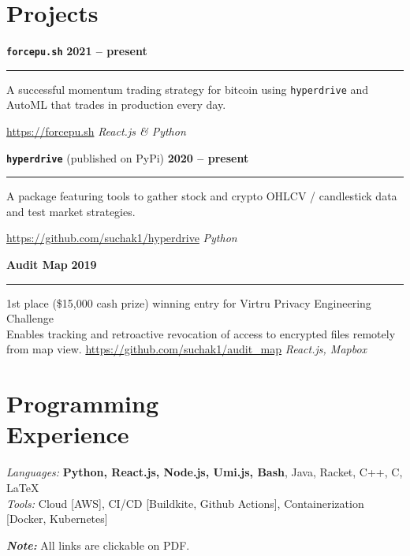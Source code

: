 \documentclass[margin]{resume}
\begin{document}
    \section{\mysidestyle Projects}

\texttt{\textbf{force}\textcolor{blu}{\textbf{pu.sh}}} \hfill \textbf{2021 -- present}
\hrule
A successful momentum trading strategy for bitcoin using \texttt{hyperdrive} and AutoML that trades in production every day.  

\url{https://forcepu.sh} \hfill \textit{React.js \& Python}


\texttt{\textbf{hyperdrive}} (published on PyPi) \hfill \textbf{2020 -- present}
\hrule
A package featuring tools to gather stock and crypto OHLCV / candlestick data and test market strategies. 

\url{https://github.com/suchak1/hyperdrive} \hfill \textit{Python}

\textcolor{blu}{\textbf{Audit Map}} \hfill \textbf{2019}
\hrule
1st place (\$15,000 cash prize) winning entry for Virtru Privacy Engineering Challenge \\ 
Enables tracking and retroactive revocation of access to encrypted files remotely from map view.
\url{https://github.com/suchak1/audit_map} \hfill \textit{React.js, Mapbox}
        \section{\mysidestyle Programming\\Experience}

    \emph{Languages:} \textbf{Python, React.js, Node.js, Umi.js, Bash}, Java, Racket, C++, C, \LaTeX \\
    \emph{Tools:} Cloud [AWS], CI/CD [Buildkite, Github Actions], Containerization [Docker, Kubernetes]
    
\textbf {\textit {Note:}} All links are clickable on PDF.
    
\end{document}
